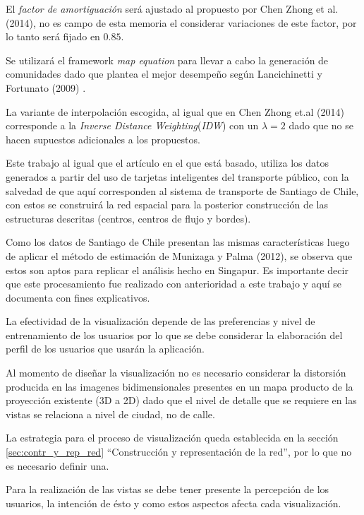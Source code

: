 \documentclass[12pt]{article}
\begin{document}
	El \textit{factor de amortiguación} será ajustado al propuesto por Chen Zhong et al. (2014)\cite{Estructura_urbana}, no es campo de esta memoria el considerar variaciones de este factor, por lo tanto será fijado en $0.85$.

	Se utilizará el framework \textit{map equation}	 para llevar a cabo la generación de comunidades dado que plantea el mejor desempeño según Lancichinetti y Fortunato (2009) \cite{Comparar_generador_comunidad}.
	
La variante de interpolación escogida, al igual que en Chen Zhong et.al (2014) corresponde a la \textit{Inverse Distance Weighting}(\textit{IDW}) con un $\lambda=2$ dado que no se hacen supuestos adicionales a los propuestos.
	
	
    Este trabajo al igual que el artículo en el que está basado, utiliza los datos generados a partir del uso de tarjetas inteligentes del transporte público, con la salvedad de que aquí corresponden al sistema de transporte de Santiago de Chile, con estos se construirá  la red espacial para la posterior construcción de las estructuras descritas (centros, centros de flujo y bordes).
	
	Como los datos de Santiago de Chile presentan las mismas características luego de aplicar el método de estimación de Munizaga y Palma (2012), se observa que estos son aptos para replicar el análisis hecho en Singapur. Es importante decir que este procesamiento fue realizado con anterioridad a este trabajo y aquí se documenta con fines explicativos.

La efectividad de la visualización depende de las preferencias  y nivel de entrenamiento de los usuarios por lo que se debe considerar la elaboración del perfil de los usuarios que usarán la aplicación. 

Al momento de diseñar la visualización no es necesario considerar la distorsión producida en las imagenes bidimensionales presentes en un mapa producto de la proyección existente (3D a 2D) dado que el nivel de detalle que se requiere en las vistas se relaciona a nivel de ciudad, no de calle. 

La estrategia para el proceso de visualización queda establecida en la sección \ref{sec:contr_y_rep_red} ``Construcción y representación de la red'', por lo que no es necesario definir una.

	Para la realización de las vistas se debe tener presente la percepción de los usuarios, la intención de ésto y como estos aspectos afecta cada visualización.
	
\end{document}
